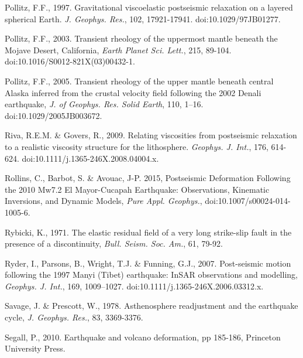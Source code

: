 \documentclass[extra]{gji}
\begin{document}
\begin{thebibliography}{}
 Pollitz, F.F.,
  1997. Gravitational viscoelastic postseismic relaxation on a layered
  spherical Earth. \textit{J. Geophys. Res.}, 102,
  17921-17941. doi:10.1029/97JB01277.

 Pollitz, F.F., 2003. Transient
  rheology of the uppermost mantle beneath the Mojave Desert,
  California, \textit{Earth Planet Sci. Lett.}, 215,
  89-104. doi:10.1016/S0012-821X(03)00432-1.

Pollitz, F.F., 2005. Transient
  rheology of the upper mantle beneath central Alaska inferred from
  the crustal velocity field following the 2002 Denali earthquake,
  \textit{J. of Geophys. Res. Solid Earth}, 110,
  1–16. doi:10.1029/2005JB003672.

 Riva, R.E.M. \&
  Govers, R., 2009. Relating viscosities from postseismic relaxation
  to a realistic viscosity structure for the
  lithosphere. \textit{Geophys. J.  Int.}, 176,
  614-624. doi:10.1111/j.1365-246X.2008.04004.x.

 Rollins, C., Barbot,
  S. \& Avouac, J-P. 2015, Postseismic Deformation Following the 2010
  Mw7.2 El Mayor-Cucapah Earthquake: Observations, Kinematic
  Inversions, and Dynamic Models, \textit{Pure Appl. Geophys.},
  doi:10.1007/s00024-014-1005-6.

 Rybicki, K., 1971. The elastic
  residual field of a very long strike-slip fault in the presence of a
  discontinuity, \textit{Bull. Seism. Soc. Am.}, 61, 79-92.

 Ryder, I., Parsons, B.,
  Wright, T.J. \& Funning, G.J., 2007.  Post-seismic motion following
  the 1997 Manyi (Tibet) earthquake: InSAR observations and
  modelling, \textit{Geophys. J. Int.}, 169,
  1009–1027. doi:10.1111/j.1365-246X.2006.03312.x.

 Savage, J. \&
  Prescott, W., 1978. Asthenosphere readjustment and the earthquake
  cycle, \textit{J. Geophys. Res.}, 83, 3369-3376.

 Segall, P., 2010. Earthquake and
  volcano deformation, pp 185-186, Princeton University Press.



\end{thebibliography}
\end{document}
